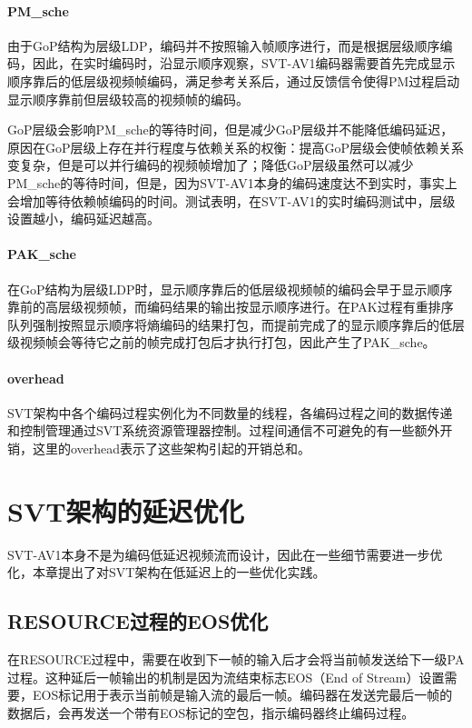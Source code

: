 \paragraph{PM\_sche} 由于GoP结构为层级LDP，编码并不按照输入帧顺序进行，而是根据层级顺序编码，因此，在实时编码时，沿显示顺序观察，SVT-AV1编码器需要首先完成显示顺序靠后的低层级视频帧编码，满足参考关系后，通过反馈信令使得PM过程启动显示顺序靠前但层级较高的视频帧的编码。

GoP层级会影响PM\_sche的等待时间，但是减少GoP层级并不能降低编码延迟，原因在GoP层级上存在并行程度与依赖关系的权衡：提高GoP层级会使帧依赖关系变复杂，但是可以并行编码的视频帧增加了；降低GoP层级虽然可以减少PM\_sche的等待时间，但是，因为SVT-AV1本身的编码速度达不到实时，事实上会增加等待依赖帧编码的时间。测试表明，在SVT-AV1的实时编码测试中，层级设置越小，编码延迟越高。

\paragraph{PAK\_sche} 在GoP结构为层级LDP时，显示顺序靠后的低层级视频帧的编码会早于显示顺序靠前的高层级视频帧，而编码结果的输出按显示顺序进行。在PAK过程有重排序队列强制按照显示顺序将熵编码的结果打包，而提前完成了的显示顺序靠后的低层级视频帧会等待它之前的帧完成打包后才执行打包，因此产生了PAK\_sche。

\paragraph{overhead} SVT架构中各个编码过程实例化为不同数量的线程，各编码过程之间的数据传递和控制管理通过SVT系统资源管理器控制。过程间通信不可避免的有一些额外开销，这里的overhead表示了这些架构引起的开销总和。

\section{SVT架构的延迟优化\label{sec:svt-optimization}}

SVT-AV1本身不是为编码低延迟视频流而设计，因此在一些细节需要进一步优化，本章提出了对SVT架构在低延迟上的一些优化实践。

\subsection{RESOURCE过程的EOS优化}
  在RESOURCE过程中，需要在收到下一帧的输入后才会将当前帧发送给下一级PA过程。这种延后一帧输出的机制是因为流结束标志EOS（End of Stream）设置需要，EOS标记用于表示当前帧是输入流的最后一帧。编码器在发送完最后一帧的数据后，会再发送一个带有EOS标记的空包，指示编码器终止编码过程。

